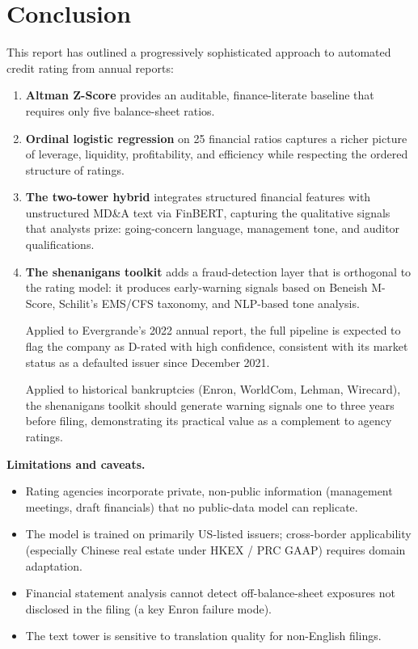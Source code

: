 \documentclass[12pt, a4paper]{article}
\begin{document}
\newpage

\section{Conclusion}
\label{sec:conclusion}

This report has outlined a progressively sophisticated approach to automated credit rating from annual reports:

\begin{enumerate}
  \item \textbf{Altman Z-Score} provides an auditable, finance-literate baseline that requires only five balance-sheet ratios.
  \item \textbf{Ordinal logistic regression} on 25 financial ratios captures a richer picture of leverage, liquidity, profitability, and efficiency while respecting the ordered structure of ratings.
  \item \textbf{The two-tower hybrid} integrates structured financial features with unstructured MD\&A text via FinBERT, capturing the qualitative signals that analysts prize: going-concern language, management tone, and auditor qualifications.
  \item \textbf{The shenanigans toolkit} adds a fraud-detection layer that is orthogonal to the rating model: it produces early-warning signals based on Beneish M-Score, Schilit's EMS/CFS taxonomy, and NLP-based tone analysis.

Applied to Evergrande's 2022 annual report, the full pipeline is expected to flag the company as D-rated with high confidence, consistent with its market status as a defaulted issuer since December 2021.

Applied to historical bankruptcies (Enron, WorldCom, Lehman, Wirecard), the shenanigans toolkit should generate warning signals one to three years before filing, demonstrating its practical value as a complement to agency ratings.

\end{enumerate}

\begin{keyinsight}
\textbf{Limitations and caveats.}
\begin{itemize}
  \item Rating agencies incorporate private, non-public information (management meetings, draft financials) that no public-data model can replicate.
  \item The model is trained on primarily US-listed issuers; cross-border applicability (especially Chinese real estate under HKEX / PRC GAAP) requires domain adaptation.
  \item Financial statement analysis cannot detect off-balance-sheet exposures not disclosed in the filing (a key Enron failure mode).
  \item The text tower is sensitive to translation quality for non-English filings.
\end{itemize}
\end{keyinsight}
\end{document}
